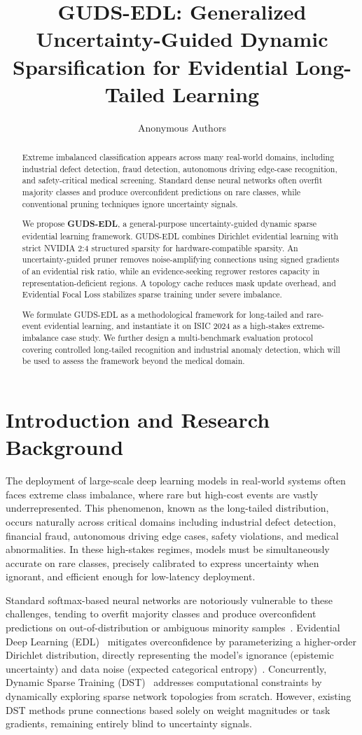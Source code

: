 \documentclass[letterpaper]{article} %
\title{GUDS-EDL: Generalized Uncertainty-Guided Dynamic Sparsification for Evidential Long-Tailed Learning}
\author{Anonymous Authors}
\begin{document}
\begin{abstract}
Extreme imbalanced classification appears across many real-world domains, including industrial defect detection, fraud detection, autonomous driving edge-case recognition, and safety-critical medical screening. Standard dense neural networks often overfit majority classes and produce overconfident predictions on rare classes, while conventional pruning techniques ignore uncertainty signals. 

We propose \textbf{GUDS-EDL}, a general-purpose uncertainty-guided dynamic sparse evidential learning framework. GUDS-EDL combines Dirichlet evidential learning with strict NVIDIA 2:4 structured sparsity for hardware-compatible sparsity. An uncertainty-guided pruner removes noise-amplifying connections using signed gradients of an evidential risk ratio, while an evidence-seeking regrower restores capacity in representation-deficient regions. A topology cache reduces mask update overhead, and Evidential Focal Loss stabilizes sparse training under severe imbalance. 

We formulate GUDS-EDL as a methodological framework for long-tailed and rare-event evidential learning, and instantiate it on ISIC 2024 as a high-stakes extreme-imbalance case study. We further design a multi-benchmark evaluation protocol covering controlled long-tailed recognition and industrial anomaly detection, which will be used to assess the framework beyond the medical domain.
\end{abstract}

\section{Introduction and Research Background}\label{sec:intro}

The deployment of large-scale deep learning models in real-world systems often faces extreme class imbalance, where rare but high-cost events are vastly underrepresented. This phenomenon, known as the long-tailed distribution, occurs naturally across critical domains including industrial defect detection, financial fraud, autonomous driving edge cases, safety violations, and medical abnormalities. In these high-stakes regimes, models must be simultaneously accurate on rare classes, precisely calibrated to express uncertainty when ignorant, and efficient enough for low-latency deployment.

Standard softmax-based neural networks are notoriously vulnerable to these challenges, tending to overfit majority classes and produce overconfident predictions on out-of-distribution or ambiguous minority samples~\cite{guo2017calibration}. Evidential Deep Learning (EDL)~\cite{sensoy2018evidential} mitigates overconfidence by parameterizing a higher-order Dirichlet distribution, directly representing the model's ignorance (epistemic uncertainty) and data noise (expected categorical entropy)~\cite{malinin2018predictive}. Concurrently, Dynamic Sparse Training (DST)~\cite{evci2020rigging} addresses computational constraints by dynamically exploring sparse network topologies from scratch. However, existing DST methods prune connections based solely on weight magnitudes or task gradients, remaining entirely blind to uncertainty signals.
\end{document}
